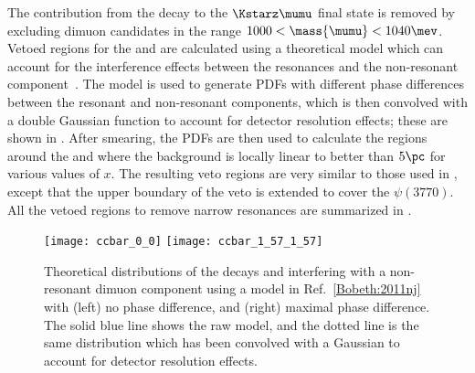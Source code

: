 The contribution from the decay \decay{\phi}{\mumu} to the $\Kstarz\mumu$ final state is removed by
excluding dimuon candidates in the range $1000<\mass{\mumu}<1040\mev$.
Vetoed regions for the \jpsi and \psitwos are calculated using a theoretical
model which can account for the interference effects between the
\decay{\ccbar}{\mumu} resonances and the non-resonant \mumu component~\cite{Bobeth:2011nj}.
The model is used to generate \glspl{PDF} with different phase differences between the resonant and
non-resonant components, which is then convolved with a double Gaussian function to account for
detector resolution effects; these are shown in .
After smearing, the \glspl{PDF} are then used to
calculate the regions around the \jpsi and \psitwos where the
background is locally linear to better than $5\pc$ for various values of $x$.
The resulting veto regions are very similar to those used in
, except that the upper boundary of the \psitwos veto is extended to cover
the $\psi(3770)$.
All the vetoed regions to remove narrow resonances are summarized in
.





\begin{figure}
  \begin{center}
    \texttt{[image: ccbar\_0\_0]}
    \texttt{[image: ccbar\_1\_57\_1\_57]}
    \caption[Theoretical distributions of \ccbar resonances interfering with a non-resonant
    coponent]
    {
      Theoretical distributions of the decays \jpsitomumu and \decay{\psitwos}{\mumu} interfering
      with a non-resonant dimuon component using a model in Ref.~\protect\ref{Bobeth:2011nj} with
      (left) no phase difference, and
      (right) maximal phase difference.
      The solid blue line shows the raw model, and the dotted line is the same distribution which
      has been convolved with a Gaussian to account for detector resolution effects.
    }
    \label{fig:db:ccbar}
  \end{center}
\end{figure}


